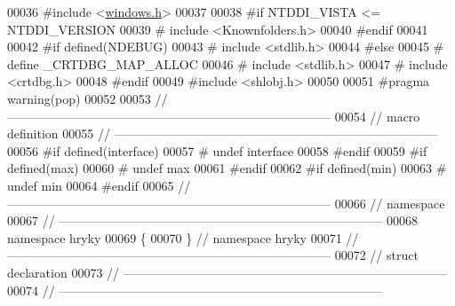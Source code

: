 \begin{DoxyCode}
00036 \textcolor{preprocessor}{#include <\hyperlink{windows_8h}{windows.h}>}
00037 
00038 \textcolor{preprocessor}{#if NTDDI\_VISTA <= NTDDI\_VERSION}
00039 \textcolor{preprocessor}{}\textcolor{preprocessor}{#    include <Knownfolders.h>}
00040 \textcolor{preprocessor}{#endif}
00041 \textcolor{preprocessor}{}
00042 \textcolor{preprocessor}{#if defined(NDEBUG)}
00043 \textcolor{preprocessor}{}\textcolor{preprocessor}{#    include <stdlib.h>}
00044 \textcolor{preprocessor}{#else}
00045 \textcolor{preprocessor}{}\textcolor{preprocessor}{#    define \_CRTDBG\_MAP\_ALLOC}
00046 \textcolor{preprocessor}{}\textcolor{preprocessor}{#    include <stdlib.h>}
00047 \textcolor{preprocessor}{#    include <crtdbg.h>}
00048 \textcolor{preprocessor}{#endif}
00049 \textcolor{preprocessor}{}\textcolor{preprocessor}{#include <shlobj.h>}
00050 
00051 \textcolor{preprocessor}{#pragma warning(pop)}
00052 \textcolor{preprocessor}{}
00053 \textcolor{comment}{//
      ------------------------------------------------------------------------------}
00054 \textcolor{comment}{// macro definition}
00055 \textcolor{comment}{//
      ------------------------------------------------------------------------------}
00056 \textcolor{preprocessor}{#if defined(interface)}
00057 \textcolor{preprocessor}{}\textcolor{preprocessor}{#   undef interface}
00058 \textcolor{preprocessor}{}\textcolor{preprocessor}{#endif}
00059 \textcolor{preprocessor}{}\textcolor{preprocessor}{#if defined(max)}
00060 \textcolor{preprocessor}{}\textcolor{preprocessor}{#   undef max}
00061 \textcolor{preprocessor}{}\textcolor{preprocessor}{#endif}
00062 \textcolor{preprocessor}{}\textcolor{preprocessor}{#if defined(min)}
00063 \textcolor{preprocessor}{}\textcolor{preprocessor}{#   undef min}
00064 \textcolor{preprocessor}{}\textcolor{preprocessor}{#endif}
00065 \textcolor{preprocessor}{}\textcolor{comment}{//
      ------------------------------------------------------------------------------}
00066 \textcolor{comment}{// namespace}
00067 \textcolor{comment}{//
      ------------------------------------------------------------------------------}
00068 \textcolor{keyword}{namespace }hryky
00069 \{
00070 \} \textcolor{comment}{// namespace hryky}
00071 \textcolor{comment}{//
      ------------------------------------------------------------------------------}
00072 \textcolor{comment}{// struct declaration}
00073 \textcolor{comment}{//
      ------------------------------------------------------------------------------}
00074 \textcolor{comment}{//
      ------------------------------------------------------------------------------}

\end{DoxyCode}
